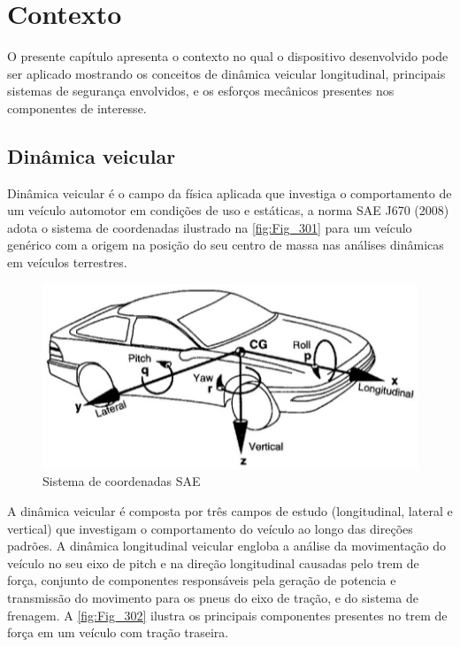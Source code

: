 

\chapter{Contexto}%

O presente capítulo apresenta o contexto no qual o dispositivo desenvolvido pode ser aplicado mostrando os conceitos de dinâmica veicular longitudinal, principais sistemas de segurança envolvidos, e os esforços mecânicos presentes nos componentes de interesse.

\section{Dinâmica veicular}


Dinâmica veicular é o campo da física aplicada que investiga o comportamento de um veículo automotor em condições de uso e estáticas, a norma SAE J670 (2008) adota o sistema de coordenadas ilustrado na \autoref{fig:Fig_301} para um veículo genérico com a origem na posição do seu centro de massa nas análises dinâmicas em veículos terrestres.

\begin{figure}[htb]
	\caption{\label{fig:Fig_301}Sistema de coordenadas SAE}
	\begin{center}
		\includegraphics[width=\textwidth]{images/img301.jpg}
	\end{center}
\end{figure}	

A dinâmica veicular é composta por três campos de estudo (longitudinal, lateral e vertical) que investigam o comportamento do veículo ao longo das direções padrões. A dinâmica longitudinal veicular engloba a análise da movimentação do veículo no seu eixo de pitch e na direção longitudinal causadas pelo trem de força, conjunto de componentes responsáveis pela geração de potencia e transmissão do movimento para os pneus do eixo de tração, e do sistema de frenagem. A \autoref{fig:Fig_302} ilustra os principais componentes presentes no trem de força em um veículo com tração traseira.

